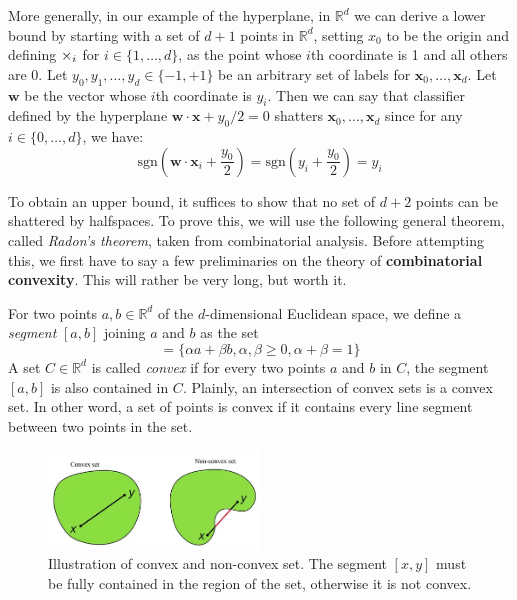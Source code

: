 More generally, in our example of the hyperplane, in $\mathbb{R}^{d}$ we can derive a lower bound by starting with a set of $d+1$ points in $\mathbb{R}^{d}$, setting $x_{0}$ to be the origin and defining $\times_{i}$ for $i\in \{1,\dots,d\}$, as the point whose $i$th coordinate is 1 and all others are 0. Let $y_{0},y_{1},\dots,y_{d}\in \{-1,+1\}$ be an arbitrary set of labels for $\mathbf{x}_{0},\dots,\mathbf{x}_{d}$. Let $\mathbf{w}$ be the vector whose $i$th coordinate is $y_{i}$. Then we can say that classifier defined by the hyperplane $\mathbf{w}\cdot \mathbf{x}+ y_{0}/2=0$ shatters $\mathbf{x}_0,\dots,\mathbf{x}_{d}$ since for any $i\in \{0,\dots,d\}$, we have: 
\begin{equation}
    \mathrm{sgn}\left(\mathbf{w}\cdot \mathbf{x}_{i} + \frac{y_0}{2}\right) = \mathrm{sgn}\left(y_{i}+ \frac{y_{0}}{2}\right) = y_{i}
\end{equation}

To obtain an upper bound, it suffices to show that no set of $d+2$ points can be shattered by halfspaces. To prove this, we will use the following general theorem, called \textit{Radon's theorem}, taken from combinatorial analysis. Before attempting this, we first have to say a few preliminaries on the theory of \textbf{combinatorial convexity}. This will rather be very long, but worth it. 

For two points $a,b\in \mathbb{R}^{d}$ of the $d$-dimensional Euclidean space, we define a \textit{segment} $[a,b]$ joining $a$ and $b$ as the set \begin{equation}
    [a,b]=\{\alpha a + \beta b, \alpha,\beta \geq 0, \alpha + \beta = 1\}
\end{equation}
A set $C\in \mathbb{R}^{d}$ is called \textit{convex} if for every two points $a$ and $b$ in $C$, the segment $[a,b]$ is also contained in $C$. Plainly, an intersection of convex sets is a convex set. In other word, a set of points is convex if it contains every line segment between two points in the set. 

\begin{figure}[h!]
    \centering
    \includegraphics[width=0.5\textwidth]{img/convex_set.png}
    \caption{Illustration of convex and non-convex set. The segment $[x,y]$ must be fully contained in the region of the set, otherwise it is not convex.}
\end{figure}

